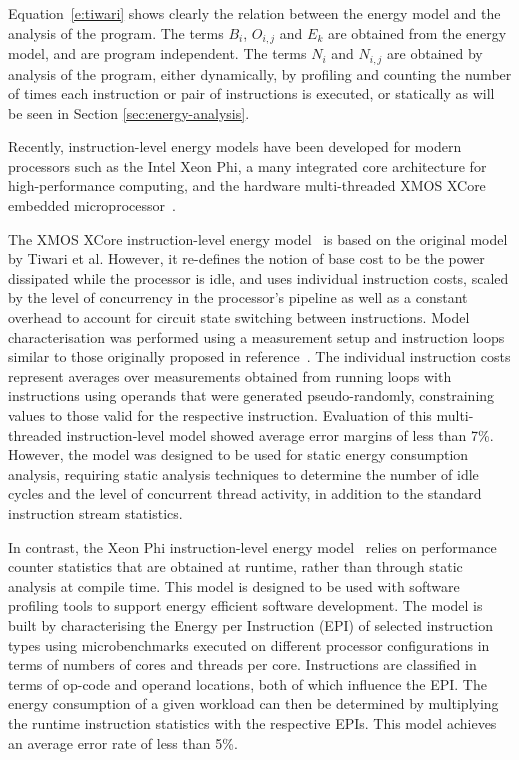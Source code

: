 Equation~\ref{e:tiwari} shows clearly the relation between the energy model and the
analysis of the program.  The terms $B_i$, $O_{i,j}$ and $E_k$ are obtained from the energy
model, and are program independent. The terms $N_i$ and $N_{i,j}$ are obtained by
analysis of the program, either dynamically, by profiling and counting the number of 
times each instruction or pair of instructions is executed, or statically as will be seen
in Section \ref{sec:energy-analysis}.


Recently, instruction-level energy models have been developed for modern
processors such as the Intel Xeon Phi, a many integrated core architecture for
high-performance computing, and the hardware multi-threaded XMOS XCore embedded
microprocessor~\cite{XMOS:Arch}.

The XMOS XCore instruction-level energy
model~\cite{DBLP:journals/tecs/KerrisonE15} is based on the original model by
Tiwari et al. However, it re-defines the notion of base cost to be the power
dissipated while the processor is idle, and uses individual instruction costs,
scaled by the level of concurrency in the processor's pipeline as well as a
constant overhead to account for circuit state switching between instructions.
%
Model characterisation was performed using a measurement setup and instruction
loops similar to those originally proposed in reference~\cite{Tiwari-embedded-1994}. The
individual instruction costs represent averages over measurements obtained from
running loops with instructions using operands that were generated
pseudo-randomly, constraining values to those valid for the respective
instruction.
%
Evaluation of this multi-threaded instruction-level model showed average error
margins of less than 7\%. 
%
However, the model was designed to be used for static energy consumption analysis,
requiring static analysis techniques to determine the number of idle cycles and
the level of concurrent thread activity, in addition to the standard
instruction stream statistics.

In contrast, the Xeon Phi instruction-level energy model~\cite{phimodel} relies
on performance counter statistics that are obtained at runtime, rather than
through static analysis at compile time. This model is designed to be used with
software profiling tools to support energy efficient software development. The
model is built by characterising the Energy per Instruction (EPI) of selected
instruction types using microbenchmarks executed on different processor
configurations in terms of numbers of cores and threads per core. Instructions
are classified in terms of op-code and operand locations, both of which
influence the EPI.
%
The energy consumption of a given workload can then be determined by
multiplying the runtime instruction statistics with the respective EPIs.
%
This model achieves an average error rate of less than 5\%.


